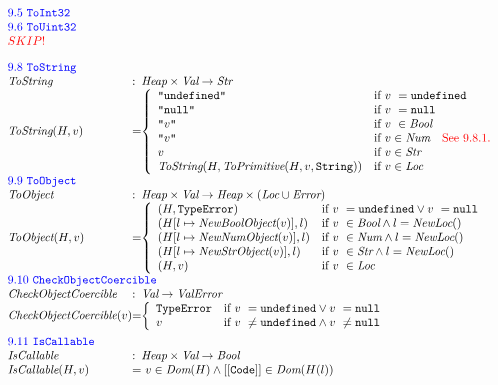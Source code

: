 \documentclass[a4paper, leqno]{amsart}
\def\inred{\color{red}}
\def\inblue{\color{blue}}
\newcommand{\nullK}{{\tt null}}
\newcommand{\undef}{{\tt undefined}}
\newcommand{\Bool}{\emph{Bool}}
\newcommand{\ValError}{\emph{ValError}}
\newcommand{\Error}{\emph{Error}}
\newcommand{\te}{{\tt TypeError}}
\newcommand{\Val}{\emph{Val}}
\newcommand{\Loc}{\emph{Loc}}
\newcommand{\Str}{\emph{Str}}
\newcommand{\Num}{\emph{Num}}
\newcommand{\Heap}{\emph{Heap}}
\newcommand{\hf}[1]{\emph{#1}}
\def\inred{\color{red}}
\def\inblue{\color{blue}}
\begin{document}
\[\begin{array}{l@{}l@{}ll}
\multicolumn{3}{l}{\mbox{\inblue 9.5 {\tt ToInt32}}}\\
\multicolumn{3}{l}{\mbox{\inblue 9.6 {\tt ToUint32}}}\\
{\inred SKIP!}\\[1em]


\multicolumn{3}{l}{\mbox{\inblue 9.8 {\tt ToString}}}\\
\hf{ToString} & :& \Heap \times \Val \rightarrow \Str \\
\hf{ToString}(H,v) &=&
\left\{ \begin{array}{ll}
\verb+"undefined"+ &\mbox{if $v\ = \undef$}\\
\verb+"null"+ &\mbox{if $v\ = \nullK$}\\
\verb+"+v\verb+"+&\mbox{if $v\ \in \Bool$}\\
\verb+"+v\verb+"+ &\mbox{if $v\in\Num$\quad{\inred See 9.8.1.}}\\
v &\mbox{if $v\in\Str$}\\
\hf{ToString}(H,\hf{ToPrimitive}(H,v,\verb+String+)) &\mbox{if $v\in\Loc$}\\
\end{array}
\right.
\\[1em]

\multicolumn{3}{l}{\mbox{\inblue 9.9 {\tt ToObject}}}\\
\hf{ToObject} & :& \Heap \times \Val \rightarrow \Heap \times (\Loc \cup \Error) \\
\hf{ToObject}(H, v) &=&
\left\{ \begin{array}{ll}
(H, \te) &\mbox{if $v\ = \undef \vee v\ = \nullK$}\\
(H[l\mapsto\hf{NewBoolObject}(v)], l)&\mbox{if $v\ \in \Bool\wedge l = \hf{NewLoc}()$}\\
(H[l\mapsto\hf{NewNumObject}(v)], l)&\mbox{if $v\ \in \Num\wedge l = \hf{NewLoc}()$}\\
(H[l\mapsto\hf{NewStrObject}(v)], l)&\mbox{if $v\ \in \Str\wedge l = \hf{NewLoc}()$}\\
(H, v) &\mbox{if $v\ \in \Loc$}\\
\end{array}
\right.
\\[1em]

\multicolumn{3}{l}{\mbox{\inblue 9.10 {\tt CheckObjectCoercible}}}\\
\hf{CheckObjectCoercible} & :& \Val \rightarrow \ValError \\
\hf{CheckObjectCoercible}(v) &=&
\left\{ \begin{array}{ll}
\te &\mbox{if $v\ = \undef \vee v\ = \nullK$}\\
v &\mbox{if $v\ \not= \undef \wedge v\ \not= \nullK$}\\
\end{array}
\right.
\\[1em]

\multicolumn{3}{l}{\mbox{\inblue 9.11 {\tt IsCallable}}}\\
\hf{IsCallable} & :& \Heap \times \Val \rightarrow \Bool \\
\hf{IsCallable}(H,v) &=&\
v \in \hf{Dom}(H) \wedge {\tt[[Code]]} \in \hf{Dom}(H(l))
\end{array}
\]
\end{document}
